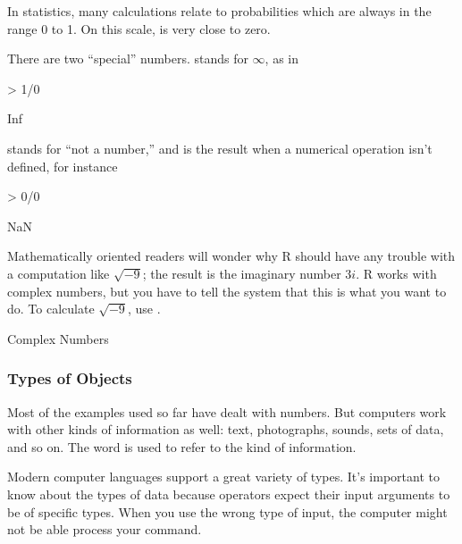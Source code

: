 In statistics, many calculations relate to probabilities which are
always in the range 0 to 1.  On this scale,  is very
close to zero. 


There are two ``special'' numbers.   stands for $\infty$, as in 
\begin{Schunk}
\begin{Sinput}
> 1/0
\end{Sinput}
\begin{Soutput}
[1] Inf
\end{Soutput}
\end{Schunk}
 stands for ``not a number,'' and is the result when a numerical
operation isn't defined, for instance
\begin{Schunk}
\begin{Sinput}
> 0/0
\end{Sinput}
\begin{Soutput}
[1] NaN
\end{Soutput}
\end{Schunk}
\begin{aside} 
Mathematically oriented readers will wonder why R should have any
trouble with a computation like $\sqrt{-9}$; the result is the
imaginary number $3i$.  R works with complex numbers, but you have to
tell the system that this is what you want to do.  To calculate
$\sqrt{-9}$, use .
\caption{\label{aside:complex-numbers}Complex Numbers}
\end{aside}

\subsubsection{Types of Objects}

Most of the examples used so far have dealt with numbers.  But
computers work with other kinds of information as well: text,
photographs, sounds, sets of data, and so on.  The word
 is used to refer to the kind of information.  

Modern
computer languages support a great variety of types.  
It's important to know about the types of data because
operators expect their input arguments to be of specific types.  When
you use the wrong type of input, the computer might not be able process your
command.
 
